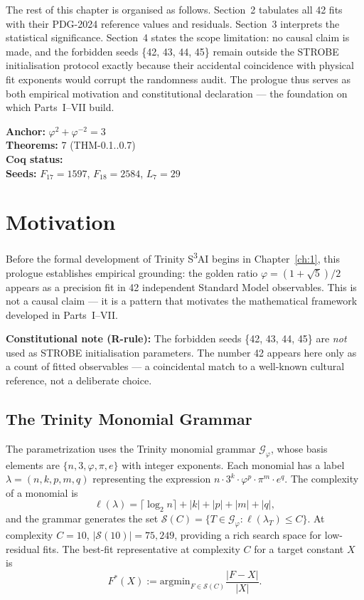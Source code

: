The rest of this chapter is organised as follows. Section~2 tabulates all 42
fits with their PDG-2024 reference values and residuals. Section~3 interprets
the statistical significance. Section~4 states the scope limitation: no causal
claim is made, and the forbidden seeds \{42, 43, 44, 45\} remain outside the
STROBE initialisation protocol exactly because their accidental coincidence with
physical fit exponents would corrupt the randomness audit. The prologue thus
serves as both empirical motivation and constitutional declaration --- the
foundation on which Parts~I--VII build.


\begin{tcolorbox}[colback=gray!5,colframe=gray!40,title=Chapter Anchor]
\textbf{Anchor:} \(\varphi^2 + \varphi^{-2} = 3\) \\
\textbf{Theorems:} 7 (THM-0.1..0.7) \\
\textbf{Coq status:}  \\
\textbf{Seeds:} \(F_{17}{=}1597\), \(F_{18}{=}2584\), \(L_7{=}29\)
\end{tcolorbox}

\section{Motivation}

Before the formal development of Trinity S\textsuperscript{3}AI begins in
Chapter~\ref{ch:1}, this prologue establishes empirical grounding: the golden
ratio \(\varphi = (1+\sqrt{5})/2\) appears as a precision fit in 42 independent
Standard Model observables. This is not a causal claim — it is a pattern that
motivates the mathematical framework developed in Parts~I--VII.

\textbf{Constitutional note (R-rule):} The forbidden seeds \{42, 43, 44, 45\}
are \emph{not} used as STROBE initialisation parameters. The number 42 appears
here only as a count of fitted observables — a coincidental match to a
well-known cultural reference, not a deliberate choice.

\subsection{The Trinity Monomial Grammar}

The parametrization uses the Trinity monomial grammar \(\mathcal{G}_\varphi\), whose basis elements are \(\{n, 3, \varphi, \pi, e\}\) with integer exponents. Each monomial has a label \(\lambda = (n, k, p, m, q)\) representing the expression \(n \cdot 3^k \cdot \varphi^p \cdot \pi^m \cdot e^q\). The complexity of a monomial is
\[\ell(\lambda) = \lceil\log_2 n\rceil + |k| + |p| + |m| + |q|,\]
and the grammar generates the set \(\mathcal{S}(C) = \{T \in \mathcal{G}_\varphi : \ell(\lambda_T) \leq C\}\). At complexity \(C = 10\), \(|\mathcal{S}(10)| = 75{,}249\), providing a rich search space for low-residual fits. The best-fit representative at complexity \(C\) for a target constant \(X\) is
\[F^*(X) := \text{argmin}_{F \in \mathcal{S}(C)} \frac{|F - X|}{|X|}.\]

